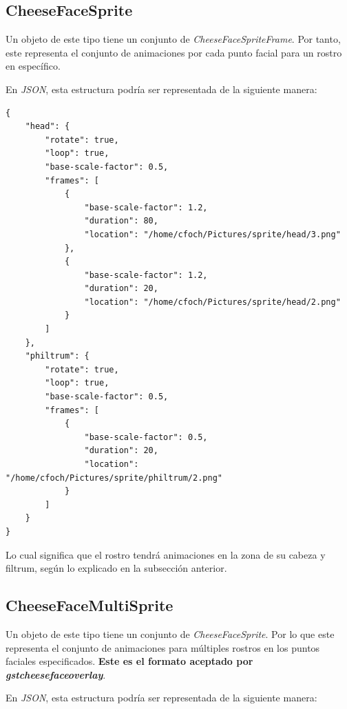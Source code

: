 \documentclass[a4paper,openright,12pt]{report}
\begin{document}
\subsection{CheeseFaceSprite}
Un objeto de este tipo tiene un conjunto de \textit{CheeseFaceSpriteFrame}. Por
tanto, este representa el conjunto de animaciones por cada punto facial para un
rostro en específico.

En \textit{JSON}, esta estructura podría ser representada de la siguiente
manera:\\

\begin{verbatim}
{
    "head": {
        "rotate": true,
        "loop": true,
        "base-scale-factor": 0.5,
        "frames": [
            {
                "base-scale-factor": 1.2,
                "duration": 80,
                "location": "/home/cfoch/Pictures/sprite/head/3.png"
            },
            {
                "base-scale-factor": 1.2,
                "duration": 20,
                "location": "/home/cfoch/Pictures/sprite/head/2.png"
            }
        ]
    },
    "philtrum": {
        "rotate": true,
        "loop": true,
        "base-scale-factor": 0.5,
        "frames": [
            {
                "base-scale-factor": 0.5,
                "duration": 20,
                "location": "/home/cfoch/Pictures/sprite/philtrum/2.png"
            }
        ]
    }
}
\end{verbatim}

Lo cual significa que el rostro tendrá animaciones en la zona de su cabeza y
filtrum, según lo explicado en la subsección anterior.

\subsection{CheeseFaceMultiSprite}
Un objeto de este tipo tiene un conjunto de \textit{CheeseFaceSprite}. Por lo
que este representa el conjunto de animaciones para múltiples rostros en
los puntos faciales especificados. \textbf{Este es el formato aceptado por
\textit{gstcheesefaceoverlay}}.

En \textit{JSON}, esta estructura podría ser representada de la siguiente
manera:\\
\end{document}
